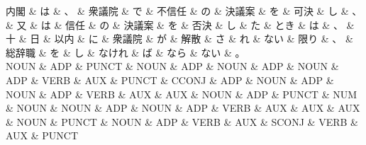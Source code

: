 \documentclass[tikz,border=5pt]{standalone}
\begin{document}
\small
\begin{dependency}[edge unit distance=12.0pt]
    \begin{deptext}[column sep=0.5em]
        内閣 \& は \& 、 \& 衆議院 \& で \& 不信任 \& の \& 決議案 \& を \& 可決 \& し \& 、 \& 又 \& は \& 信任 \& の \& 決議案 \& を \& 否決 \& し \& た \& とき \& は \& 、 \& 十 \& 日 \& 以内 \& に \& 衆議院 \& が \& 解散 \& さ \& れ \& ない \& 限り \& 、 \& 総辞職 \& を \& し \& なけれ \& ば \& なら \& ない \& 。\\
        NOUN \& ADP \& PUNCT \& NOUN \& ADP \& NOUN \& ADP \& NOUN \& ADP \& VERB \& AUX \& PUNCT \& CCONJ \& ADP \& NOUN \& ADP \& NOUN \& ADP \& VERB \& AUX \& AUX \& NOUN \& ADP \& PUNCT \& NUM \& NOUN \& NOUN \& ADP \& NOUN \& ADP \& VERB \& AUX \& AUX \& AUX \& NOUN \& PUNCT \& NOUN \& ADP \& VERB \& AUX \& SCONJ \& VERB \& AUX \& PUNCT\\
    \end{deptext}
\end{dependency}
\end{document}
